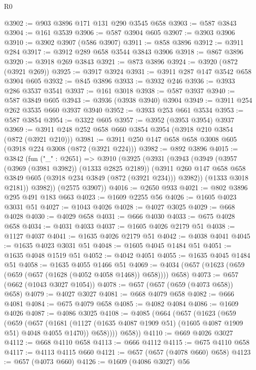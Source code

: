 \begin{lexlean}{R0}
\begin{coremodule}
@3902 := @903 @3896 @171 @131 @290 @3545 @658
@3903 := @587 @3843
@3904 := @161 @3539
@3906 := @587 @3904 @605
@3907 := @3903 @3906
@3910 := @3902 @3907 (@586 @3907)
@3911 := @858 @3896
@3912 := @3911 @284
@3917 := @3912 @289 @658 @3544 @3843 @3906
@3918 := @867 @3896
@3920 := @3918 @269 @3843
@3921 := @873 @3896
@3924 := @3920 (@872 (@3921 @269))
@3925 := @3917 @3924
@3931 := @3911 @287 @147 @3542 @658 @3904 @605
@3932 := @845 @3896
@3933 := @3932 @246
@3936 := @3933 @286 @3537 @3541
@3937 := @161 @3018
@3938 := @587 @3937
@3940 := @587 @3849 @605
@3943 := @3936 (@3938 @3940) @3904
@3949 := @3911 @254 @262 @3535 @660 @3937 @3940
@3952 := @3933 @253 @661 @3534
@3953 := @587 @3854
@3954 := @3322 @605
@3957 := @3952 (@3953 @3954) @3937
@3969 := @3911 @248 @252 @658 @660 @3854 @3954 (@3918 @210 @3854 (@872 (@3921 @210)))
@3981 := @3911 @250 @147 @658 @658 @3008 @605 (@3918 @224 @3008 (@872 (@3921 @224)))
@3982 := @892 @3896
@4015 := @3842
    (fun ("_" : @2651) =>
    @3910
      (@3925
        (@3931
          (@3943
            (@3949
              (@3957 (@3969 (@3981 @3982)) (@1333 @2825 @2189))
              (@3911 @260 @147 @658 @658 @3849 @605 (@3918 @234 @3849 (@872 (@3921 @234))) @3982))
            (@1333 @3018 @2181))
          @3982))
      (@2575 @3907))
@4016 := @2650 @933
@4021 := @802 @3896 @295 @491 @183 @663
@4023 := @1609 @2255 @56
@4026 := @1605 @4023 @3031 @51
@4027 := @1043 @4026
@4028 := @4027 @3025
@4029 := @668 @4028
@4030 := @4029 @658
@4031 := @666 @4030
@4033 := @675 @4028 @658
@4034 := @4031 @4033
@4037 := @1605 @4026 @2179 @51
@4038 := @1127 @4037
@4041 := @1635 @4026 @2179 @51
@4042 := @4038 @4041
@4045 := @1635 @4023 @3031 @51
@4048 := @1605 @4045 @1484 @51
@4051 := @1635 @4048 @1519 @51
@4052 := @4042 @4051
@4055 := @1635 @4045 @1484 @51
@4058 := @1635 @4055 @1466 @51
@4069 := @4034 (@657 (@1623 (@659 (@659 (@657 (@1628 (@4052 @4058 @1468)) @658)))) @658)
@4073 := @657 (@662 (@1043 @3027 @1054))
@4078 := @657 (@657 (@659 (@4073 @658)) @658)
@4079 := @4027 @3027
@4081 := @668 @4079 @658
@4082 := @666 @4081
@4084 := @675 @4079 @658
@4085 := @4082 @4084
@4086 := @1609 @4026
@4087 := @4086 @3025
@4108 := @4085
    (@664
      (@657
        (@1623
          (@659
            (@659
              (@657
                (@1681 (@1127 (@1635 @4087 @1909 @51) (@1605 @4087 @1909 @51) @4048 @4055 @1470))
                @658))))
        @658))
@4110 := @669 @4026 @3027
@4112 := @668 @4110 @658
@4113 := @666 @4112
@4115 := @675 @4110 @658
@4117 := @4113 @4115 @660
@4121 := @657 (@657 (@4078 @660) @658)
@4123 := @657 (@4073 @660)
@4126 := @1609 (@4086 @3027) @56

\end{coremodule}
\end{lexlean}
